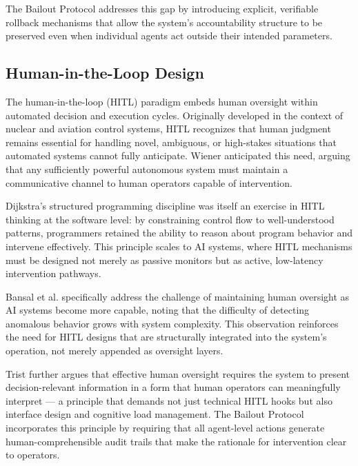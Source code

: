 The Bailout Protocol addresses this gap by introducing explicit, verifiable rollback mechanisms that allow the system's accountability structure to be preserved even when individual agents act outside their intended parameters.


\subsection{Human-in-the-Loop Design}

The human-in-the-loop (HITL) paradigm embeds human oversight within automated decision and execution cycles. Originally developed in the context of nuclear and aviation control systems, HITL recognizes that human judgment remains essential for handling novel, ambiguous, or high-stakes situations that automated systems cannot fully anticipate. Wiener \cite{wiener1948} anticipated this need, arguing that any sufficiently powerful autonomous system must maintain a communicative channel to human operators capable of intervention.

Dijkstra's structured programming discipline \cite{dijkstra1982} was itself an exercise in HITL thinking at the software level: by constraining control flow to well-understood patterns, programmers retained the ability to reason about program behavior and intervene effectively. This principle scales to AI systems, where HITL mechanisms must be designed not merely as passive monitors but as active, low-latency intervention pathways.

Bansal et al. \cite{bansal2019} specifically address the challenge of maintaining human oversight as AI systems become more capable, noting that the difficulty of detecting anomalous behavior grows with system complexity. This observation reinforces the need for HITL designs that are structurally integrated into the system's operation, not merely appended as oversight layers.

Trist \cite{tristr81} further argues that effective human oversight requires the system to present decision-relevant information in a form that human operators can meaningfully interpret — a principle that demands not just technical HITL hooks but also interface design and cognitive load management. The Bailout Protocol incorporates this principle by requiring that all agent-level actions generate human-comprehensible audit trails that make the rationale for intervention clear to operators.


